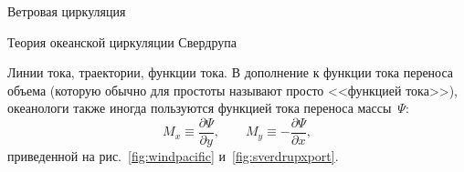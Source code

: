 \begin{chapter}{Ветровая циркуляция}
\begin{section}{Теория океанской циркуляции Свердрупа}
\begin{paragraph}{Линии тока, траектории, функции тока.}
В дополнение к функции тока переноса объема (которую обычно для простоты 
называют просто <<функцией тока>>), океанологи также иногда пользуются функцией
тока переноса массы~$\Psi$:
\begin{equation}\label{eq:11.15}
 M_x \equiv  \frac{\partial{\Psi}}{\partial{y}}, \qquad 
 M_y \equiv -\frac{\partial{\Psi}}{\partial{x}},
\end{equation}
приведенной на рис.~\ref{fig:windpacific} и~\ref{fig:sverdrupxport}.
%
\end{paragraph}
\end{section}


\end{chapter}
